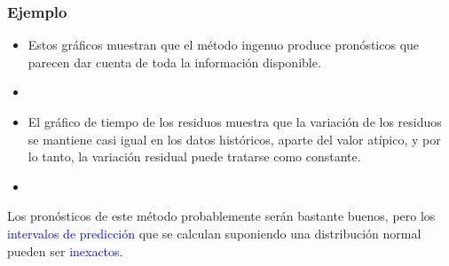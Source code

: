 \documentclass[10pt]{beamer}
\begin{document}





\begin{frame}[fragile]
\frametitle{Ejemplo}


\begin{itemize}
\small
\item Estos gráficos muestran que el método ingenuo produce pronósticos que parecen dar cuenta de toda la información disponible.

\item {}

\item El gráfico de tiempo de los residuos muestra que la variación de los residuos se mantiene casi igual en los datos históricos, aparte del valor atípico, y por lo tanto, la variación residual puede tratarse como constante.

\item {}
\end{itemize}

\vspace{4mm}

\begin{center}
Los pronósticos de este método probablemente serán bastante buenos, pero los \textcolor{blue}{intervalos de predicción} que se calculan suponiendo una distribución normal pueden ser \textcolor{blue}{inexactos}.

\end{center}
\end{frame}


\end{document}
